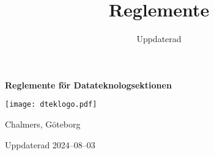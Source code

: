 \documentclass[a4paper]{dtek}
\title{Reglemente}
\date{Uppdaterad \updated}
\newcommand{\updated}{2024--08--03}
\begin{document}
\makeheadfoot%

\begin{center}
  {\Huge \textbf{Reglemente för Datateknologsektionen}}

  \texttt{[image: dteklogo.pdf]}

  {\LARGE Chalmers, Göteborg}

  \vspace{2cm}

  {\LARGE Uppdaterad \updated}
\end{center}

\newpage

\setcounter{tocdepth}{2}
\tableofcontents

\newpage

\end{document}
